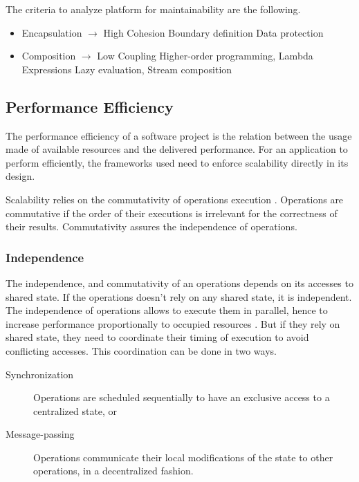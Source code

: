The criteria to analyze platform for maintainability are the following.

\begin{itemize}
\item Encapsulation $\to$ High Cohesion
  \subitem Boundary definition
  \subitem Data protection
\item Composition $\to$ Low Coupling
  \subitem Higher-order programming, Lambda Expressions
  \subitem Lazy evaluation, Stream composition
\end{itemize}


\subsection{Performance Efficiency}

The performance efficiency of a software project is the relation between the usage made of available resources and the delivered performance.
For an application to perform efficiently, the frameworks used need to enforce scalability directly in its design.

Scalability relies on the commutativity of operations execution \cite{Clements2013a}.
Operations are commutative if the order of their executions is irrelevant for the correctness of their results.
Commutativity assures the independence of operations.

\subsubsection{Independence}

The independence, and commutativity of an operations depends on its accesses to shared state.
If the operations doesn't rely on any shared state, it is independent.
The independence of operations allows to execute them in parallel, hence to increase performance proportionally to occupied resources \cite{Amdahl1967,Gunther1993}.
But if they rely on shared state, they need to coordinate their timing of execution to avoid conflicting accesses.
This coordination can be done in two ways.
\begin{description}
\item[Synchronization] Operations are scheduled sequentially to have an exclusive access to a centralized state, or
\item[Message-passing] Operations communicate their local modifications of the state to other operations, in a decentralized fashion.
\end{description}

